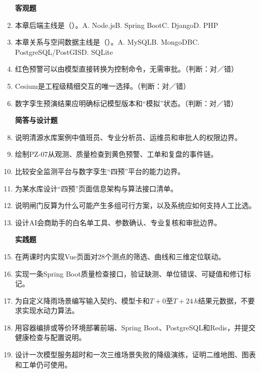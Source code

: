 \begin{enumerate}
\item[\textbf{客观题}]
\item 本章后端主线是（\quad）。A. Node.js\quad B. Spring Boot\quad C. Django\quad D. PHP
\item 本章关系与空间数据主线是（\quad）。A. MySQL\quad B. MongoDB\quad C. PostgreSQL/PostGIS\quad D. SQLite
\item 红色预警可以由模型直接转换为控制命令，无需审批。（判断：对／错）
\item Cesium是工程级精细交互的唯一选择。（判断：对／错）
\item 数字孪生预演结果应明确标记模型版本和“模拟”状态。（判断：对／错）

\item[\textbf{简答与设计题}]
\item 说明清源水库案例中值班员、专业分析员、运维员和审批人的权限边界。
\item 绘制PZ-07从观测、质量检查到黄色预警、工单和复盘的事件链。
\item 比较安全监测平台与数字孪生“四预”平台的能力边界。
\item 为某水库设计“四预”页面信息架构与算法接口清单。
\item 说明闸门反算为什么可能产生多组可行方案，以及系统应如何支持人工比选。
\item 设计AI会商助手的白名单工具、参数确认、专业复核和审批边界。

\item[\textbf{实践题}]
\item 在两课时内实现Vue页面对28个测点的筛选、曲线和三维定位联动。
\item 实现一条Spring Boot质量检查接口，验证缺测、单位错误、可疑值和修订标记。
\item 为自定义降雨场景编写输入契约、模型卡和$T+0$至$T+24\,h$结果元数据，不要求实现水动力算法。
\item 用容器编排或等价环境部署前端、Spring Boot、PostgreSQL和Redis，并提交健康检查与配置说明。
\item 设计一次模型服务超时和一次三维场景失败的降级演练，证明二维地图、图表和工单仍可使用。
\end{enumerate}
